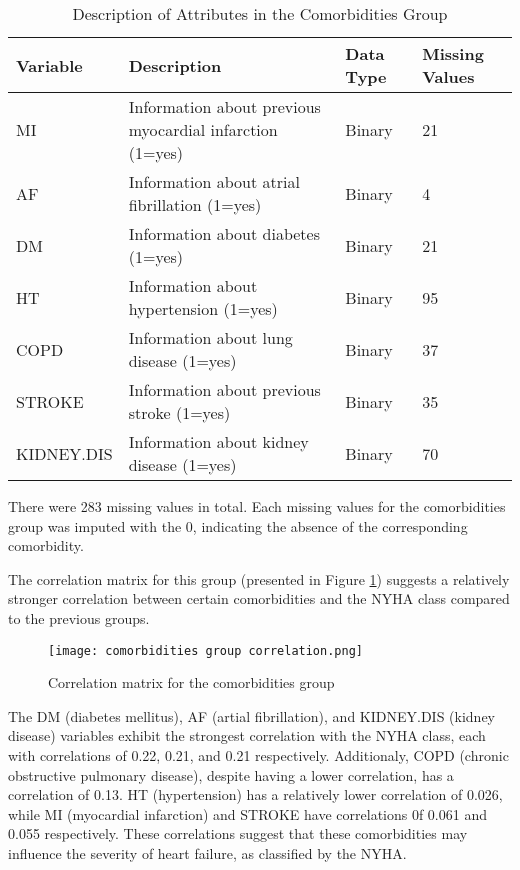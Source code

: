         \begin{table}[H]
          \centering
          \caption{Description of Attributes in the Comorbidities Group}
          \label{tab:comorbidities group attributes}
          \begin{adjustbox}{center}
          \begin{tabular}{|p{2.6cm}|p{10cm}|p{1.6cm}|p{1.8cm}|}
          \hline
          \textbf{Variable} &
          \textbf{Description} &
          \textbf{Data Type} &
          \textbf{Missing Values} \\ \hline
          MI &
          Information about previous myocardial infarction (1=yes) &
          Binary &
          21 \\
          AF &
          Information about atrial fibrillation (1=yes) &
          Binary &
          4 \\
          DM & Information about diabetes (1=yes) &
          Binary &
          21 \\
          HT & Information about hypertension (1=yes) &
          Binary &
          95 \\
          COPD & Information about lung disease (1=yes) &
          Binary &
          37 \\
          STROKE & Information about previous stroke (1=yes) &
          Binary &
          35 \\
          KIDNEY.DIS & Information about kidney disease (1=yes) &
          Binary &
          70 \\
          \hline
          \end{tabular}
          \end{adjustbox}
          \end{table}
    There were 283 missing values in total. Each missing values for the comorbidities group was imputed with the 0, indicating the absence of the corresponding comorbidity.

  The correlation matrix for this group (presented in Figure \ref{fig:comorbidities group correlation}) suggests a relatively stronger correlation between certain comorbidities and the NYHA class compared to the previous groups.

  \begin{figure}[H]
    \centering
    \texttt{[image: comorbidities group correlation.png]}
    \caption{Correlation matrix for the comorbidities group}
    \label{fig:comorbidities group correlation}
  \end{figure}

  The DM (diabetes mellitus), AF (artial fibrillation), and KIDNEY.DIS (kidney disease) variables exhibit the strongest correlation with the NYHA class, each with correlations of 0.22, 0.21, and 0.21 respectively. Additionaly, COPD (chronic obstructive pulmonary disease), despite having a lower correlation, has a correlation of 0.13. HT (hypertension) has a relatively lower correlation of 0.026, while MI (myocardial infarction) and STROKE have correlations 0f 0.061 and 0.055 respectively. These correlations suggest that these comorbidities may influence the severity  of heart failure, as classified by the NYHA. 

